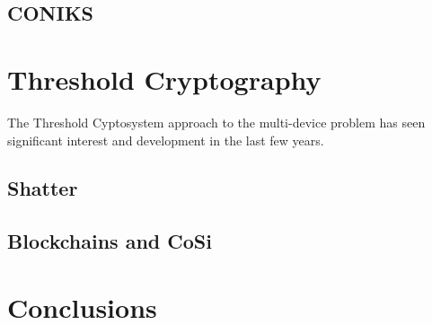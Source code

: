 \subsection{CONIKS}

\section{Threshold Cryptography}

The Threshold Cyptosystem approach to the multi-device problem has seen significant interest and development in the last few years. 

\subsection{Shatter}

\subsection{Blockchains and CoSi}

\section{Conclusions}

